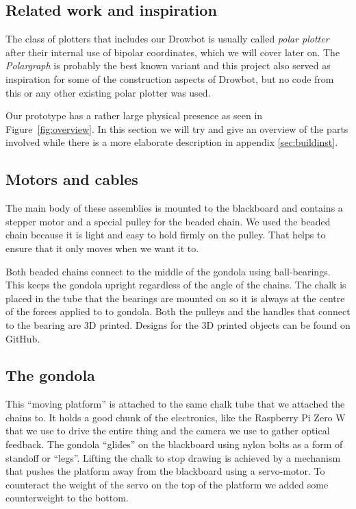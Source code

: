 \documentclass[a4paper,10pt]{article}
\begin{document}
\subsection*{Related work and inspiration}
The class of plotters that includes our Drowbot is usually called \emph{polar plotter} after their internal use
of bipolar coordinates, which we will cover later on.
The \emph{Polargraph} \cite{polargraphsite} is probably the best known variant and this project also served as inspiration for some of the construction aspects of Drowbot,
but no code from this or any other existing polar plotter was used.



Our prototype has a rather large physical presence as seen in Figure~\ref{fig:overview}.
In this section we will try and give an overview of the parts involved
while there is a more elaborate description in appendix \ref{sec:buildinst}.

\subsection*{Motors and cables}
The main body of these assemblies is mounted to the blackboard and
contains a stepper motor and a special pulley for the beaded chain.
We used the beaded chain because it is light and easy to hold firmly
on the pulley. That helps to ensure that it only moves when we want it to.

Both beaded chains connect to the middle of the gondola using ball-bearings.
This keeps the gondola upright regardless of the angle of the chains.
The chalk is placed in the tube that the bearings are mounted on so it is always
at the centre of the forces applied to to gondola.
Both the pulleys and the handles that connect to the bearing are 3D printed.
Designs for the 3D printed objects can be found on GitHub\cite{github}.

\subsection*{The gondola}
This ``moving platform'' is attached to the same chalk tube that we attached
the chains to.
It holds a good chunk of the electronics, like the Raspberry Pi Zero W
that we use to drive the entire thing and the camera we use to gather
optical feedback.
The gondola ``glides'' on the blackboard using nylon bolts as a form of
standoff or ``legs''.
Lifting the chalk to stop drawing is achieved by a mechanism that pushes the platform away from the
blackboard using a servo-motor.
To counteract the weight of the servo on the top of the platform
we added some counterweight to the bottom.
\end{document}
